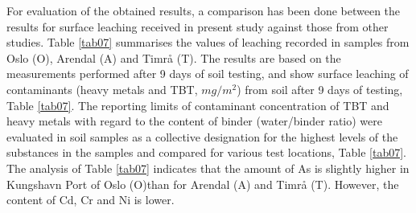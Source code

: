 \documentclass[algorithms,article,submit,pdftex,moreauthors]{Definitions/mdpi}
\begin{document}
For evaluation of the obtained results, a comparison has been done between the results for surface leaching received in present study against those from other studies. Table \ref{tab07} summarises the values of leaching recorded in samples from Oslo (O), Arendal (A) and Timrå (T). The results are based on the measurements performed after 9 days of soil testing, and show surface leaching of contaminants (heavy metals and TBT, $mg/m^2$) from soil after 9 days of testing, Table \ref{tab07}. The reporting limits of contaminant concentration of TBT and heavy metals with regard to the content of binder (water/binder ratio) were evaluated in soil samples as a collective designation for the highest levels of the substances in the samples and compared for various test locations, Table \ref{tab07}. The analysis of Table \ref{tab07} indicates that the amount of As is slightly higher in Kungshavn Port of Oslo (O)than for Arendal (A) and Timrå (T). However, the content of Cd, Cr and Ni is lower. 
\end{document}
